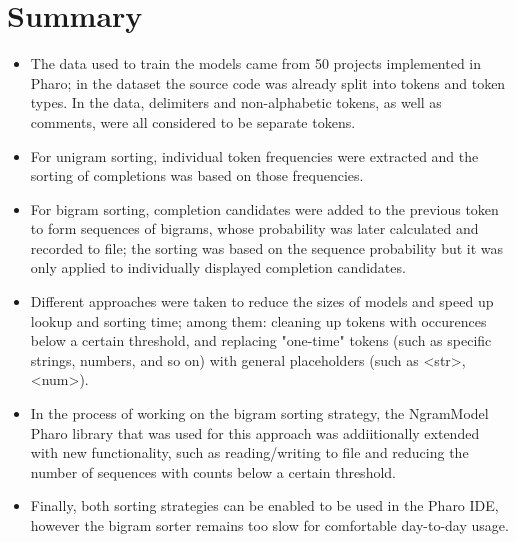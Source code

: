 \section{Summary}
\label{sec:ProposedSolution-Summary}
\begin{itemize}
    \item The data used to train the models came from 50 projects implemented in Pharo; in the dataset the source code was already split into tokens and token types. In the data, delimiters and non-alphabetic tokens, as well as comments, were all considered to be separate tokens.
    \item For unigram sorting, individual token frequencies were extracted and the sorting of completions was based on those frequencies.
    \item For bigram sorting, completion candidates were added to the previous token to form sequences of bigrams, whose probability was later calculated and recorded to file; the sorting was based on the sequence probability but it was only applied to individually displayed completion candidates.
    \item Different approaches were taken to reduce the sizes of models and speed up lookup and sorting time; among them: cleaning up tokens with occurences below a certain threshold, and replacing "one-time" tokens (such as specific strings, numbers, and so on) with general placeholders (such as <str>, <num>).
    \item In the process of working on the bigram sorting strategy, the NgramModel Pharo library that was used for this approach was addiitionally extended with new functionality, such as reading/writing to file and reducing the number of sequences with counts below a certain threshold.
    \item Finally, both sorting strategies can be enabled to be used in the Pharo IDE, however the bigram sorter remains too slow for comfortable day-to-day usage.
\end{itemize}